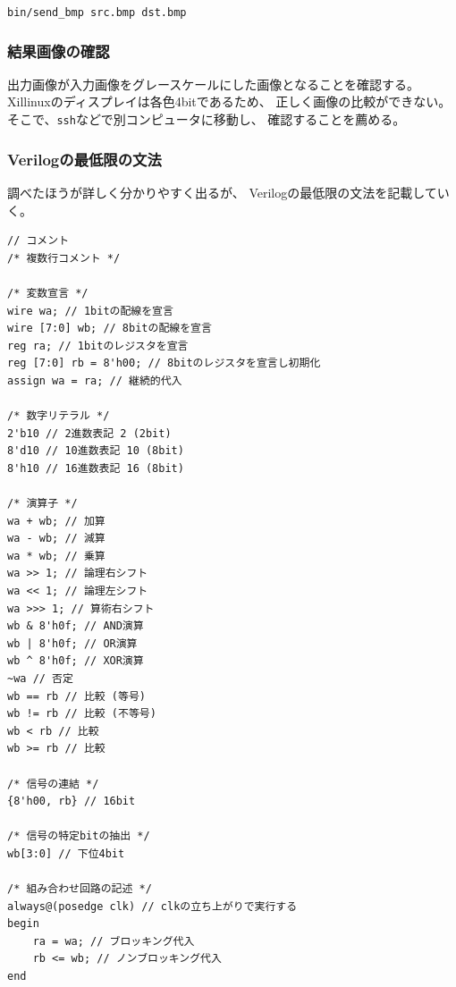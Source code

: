 \documentclass[11pt]{jsarticle}
\begin{document}
\begin{center}
	\verb|bin/send_bmp src.bmp dst.bmp|
\end{center}

\subsubsection*{結果画像の確認}
出力画像が入力画像をグレースケールにした画像となることを確認する。
Xillinuxのディスプレイは各色4bitであるため、
正しく画像の比較ができない。
そこで、\verb|ssh|などで別コンピュータに移動し、
確認することを薦める。

\subsubsection*{Verilogの最低限の文法}
調べたほうが詳しく分かりやすく出るが、
Verilogの最低限の文法を記載していく。\\
\begin{verbatim}
// コメント
/* 複数行コメント */

/* 変数宣言 */
wire wa; // 1bitの配線を宣言
wire [7:0] wb; // 8bitの配線を宣言
reg ra; // 1bitのレジスタを宣言
reg [7:0] rb = 8'h00; // 8bitのレジスタを宣言し初期化
assign wa = ra; // 継続的代入

/* 数字リテラル */
2'b10 // 2進数表記 2 (2bit)
8'd10 // 10進数表記 10 (8bit)
8'h10 // 16進数表記 16 (8bit)

/* 演算子 */
wa + wb; // 加算
wa - wb; // 減算
wa * wb; // 乗算
wa >> 1; // 論理右シフト
wa << 1; // 論理左シフト
wa >>> 1; // 算術右シフト
wb & 8'h0f; // AND演算
wb | 8'h0f; // OR演算
wb ^ 8'h0f; // XOR演算
~wa // 否定
wb == rb // 比較 (等号)
wb != rb // 比較 (不等号)
wb < rb // 比較
wb >= rb // 比較

/* 信号の連結 */
{8'h00, rb} // 16bit

/* 信号の特定bitの抽出 */
wb[3:0] // 下位4bit

/* 組み合わせ回路の記述 */
always@(posedge clk) // clkの立ち上がりで実行する
begin
    ra = wa; // ブロッキング代入
    rb <= wb; // ノンブロッキング代入
end
\end{verbatim}
\end{document}
